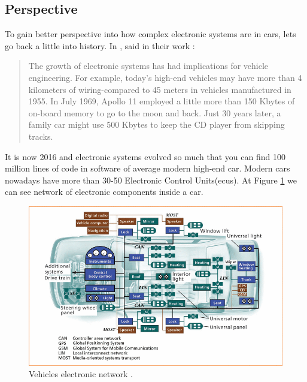 \subsection{Perspective} %
\label{sub:perspective}
To gain better perspective into how complex electronic systems are in cars, lets go back a little into history. In \citeyear{976923}, \citeauthor{976923} said in their work :
\blockquote[\cite{976923}]{The growth of electronic systems has had implications for vehicle engineering. For example, today's high-end vehicles may have more than 4 kilometers of wiring-compared to 45 meters in vehicles manufactured in 1955. In July 1969, Apollo 11 employed a little more than 150 Kbytes of on-board memory to go to the moon and back. Just 30 years later, a family car might use 500 Kbytes to keep the CD player from skipping tracks.}
It is now 2016 and electronic systems evolved so much that you can find 100 million lines of code in software of average modern high-end car\cite{lines_of_code}. Modern cars nowadays have more than 30-50 Electronic Control Units(\glspl{ecu}). At Figure \ref{fig:car_system} we can see network of electronic components inside a car.
\begin{figure}[H]
\begin{center}
\captionsetup{font=small}
\includegraphics[scale=0.5]{pics/car_system.png}
\caption{Vehicles electronic network \cite{976923}.}
\label{fig:car_system}
\end{center}
\end{figure}

